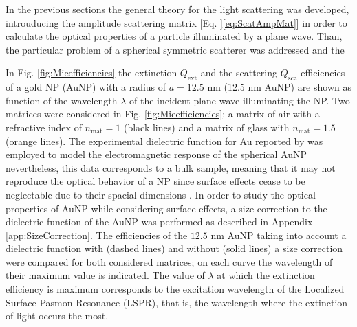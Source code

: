 
In the previous sections the general theory for the light scattering was developed, introuducing the amplitude scattering matrix [Eq. ]\eqref{eq:ScatAmpMat}] in order to calculate the optical properties of a particle illuminated by a plane wave. Than, the particular problem of a spherical symmetric scatterer was addressed and the


\clearpage

In Fig. \ref{fig:Mieefficiencies} the extinction  $Q_\text{ext}$ and the scattering  $Q_\text{sca}$ efficiencies of a gold NP (AuNP) with a radius of $a = 12.5$ nm (12.5 nm AuNP) are shown as function of the wavelength $\lambda$ of the incident plane wave illuminating the NP. Two matrices were considered in Fig. \ref{fig:Mieefficiencies}: a matrix of air with a refractive index of $n_\text{mat} = 1$ (black lines) and a matrix of glass with $n_\text{mat} = 1.5$ (orange lines).  The experimental dielectric function for Au reported by \citeauthor{johnson_optical_1972} \cite{johnson_optical_1972}  was employed to model the electromagnetic response of the spherical AuNP nevertheless, this data corresponds to a bulk sample, meaning that it may not reproduce the optical behavior of a NP since surface effects cease to be neglectable  due to their spacial dimensions \cite{noguez_surface_2007}.   In order to study  the optical properties of AuNP while considering  surface effects,  a size correction to the dielectric function of the AuNP was performed as described in Appendix \ref{app:SizeCorrection}. The efficiencies of the $12.5$ nm AuNP  taking into account a dielectric function with (dashed lines) and without (solid lines) a size correction were compared for both considered matrices; on each curve the wavelength of their maximum value is indicated. The value of $\lambda$ at which the extinction efficiency is maximum corresponds to the excitation wavelength of the Localized Surface Pasmon Resonance (LSPR), that is, the wavelength where the extinction of light occurs the most.

